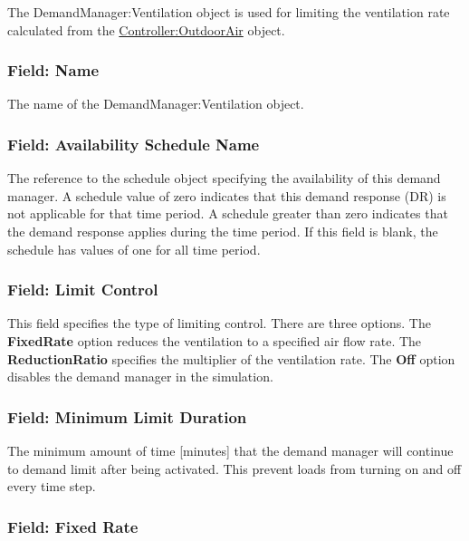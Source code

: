 The DemandManager:Ventilation object is used for limiting the ventilation rate calculated from the \hyperref[controlleroutdoorair]{Controller:OutdoorAir} object.

\subsubsection{Field: Name}\label{field-name-5-006}

The name of the DemandManager:Ventilation object.

\subsubsection{Field: Availability Schedule Name}\label{field-availability-schedule-name-4-000}

The reference to the schedule object specifying the availability of this demand manager. A schedule value of zero indicates that this demand response (DR) is not applicable for that time period. A schedule greater than zero indicates that the demand response applies during the time period. If this field is blank, the schedule has values of one for all time period.

\subsubsection{Field: Limit Control}\label{field-limit-control-3}

This field specifies the type of limiting control. There are three options. The \textbf{FixedRate} option reduces the ventilation to a specified air flow rate. The \textbf{ReductionRatio} specifies the multiplier of the ventilation rate. The \textbf{Off} option disables the demand manager in the simulation.

\subsubsection{Field: Minimum Limit Duration}\label{field-minimum-limit-duration-3}

The minimum amount of time {[}minutes{]} that the demand manager will continue to demand limit after being activated. This prevent loads from turning on and off every time step.

\subsubsection{Field: Fixed Rate}\label{field-fixed-rate}

